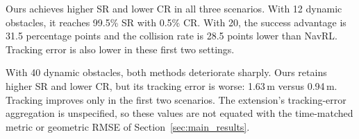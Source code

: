 Ours achieves higher SR and lower CR in all three scenarios. With 12 dynamic obstacles, it reaches 99.5\% SR with 0.5\% CR. With 20, the success advantage is 31.5 percentage points and the collision rate is 28.5 points lower than NavRL. Tracking error is also lower in these first two settings.

With 40 dynamic obstacles, both methods deteriorate sharply. Ours retains higher SR and lower CR, but its tracking error is worse: 1.63\,m versus 0.94\,m. Tracking improves only in the first two scenarios. The extension's tracking-error aggregation is unspecified, so these values are not equated with the time-matched metric or geometric RMSE of Section~\ref{sec:main_results}.
